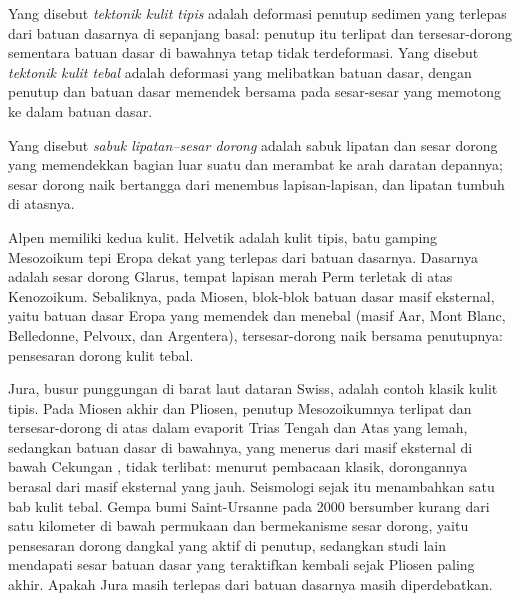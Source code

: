 \begin{definition}\label{def:b2:alpine-orogen:skin}
Yang disebut \emph{tektonik kulit tipis} adalah deformasi penutup
sedimen yang terlepas dari batuan dasarnya di sepanjang  basal: penutup itu terlipat dan
tersesar-dorong sementara batuan dasar di bawahnya tetap tidak terdeformasi. Yang disebut \emph{tektonik kulit
tebal} adalah deformasi yang melibatkan batuan dasar,
dengan penutup dan batuan dasar memendek bersama pada sesar-sesar yang memotong ke dalam batuan dasar.
\end{definition}

\begin{definition}\label{def:b2:alpine-orogen:ftb}
Yang disebut \emph{sabuk lipatan--sesar dorong} adalah sabuk lipatan dan sesar dorong
yang memendekkan bagian luar suatu  dan merambat ke arah daratan depannya; sesar dorong
naik bertangga dari  menembus lapisan-lapisan, dan lipatan tumbuh di atasnya.
\end{definition}

Alpen memiliki kedua kulit.  Helvetik adalah  kulit tipis,
batu gamping Mesozoikum tepi Eropa dekat yang terlepas dari batuan dasarnya. Dasarnya adalah
sesar dorong Glarus, tempat lapisan merah Perm terletak di atas  Kenozoikum. Sebaliknya, pada Miosen,
blok-blok batuan dasar masif eksternal, yaitu batuan dasar Eropa yang memendek dan menebal (masif
Aar, Mont Blanc, Belledonne, Pelvoux, dan Argentera), tersesar-dorong naik bersama
penutupnya: pensesaran dorong kulit tebal.

Jura, busur punggungan di barat laut dataran Swiss, adalah contoh klasik kulit
tipis. Pada Miosen akhir dan Pliosen, penutup Mesozoikumnya terlipat dan tersesar-dorong di atas
 dalam evaporit Trias Tengah dan Atas yang lemah, sedangkan batuan dasar di bawahnya,
yang menerus dari masif eksternal di bawah Cekungan , tidak terlibat: menurut
pembacaan klasik, dorongannya berasal dari masif eksternal yang jauh. Seismologi sejak itu
menambahkan satu bab kulit tebal. Gempa bumi Saint-Ursanne pada 2000 bersumber
kurang dari satu kilometer di bawah permukaan dan bermekanisme sesar dorong, yaitu pensesaran dorong dangkal yang aktif di penutup,
sedangkan studi lain mendapati sesar batuan dasar yang teraktifkan kembali sejak Pliosen paling akhir. Apakah
Jura masih terlepas dari batuan dasarnya masih diperdebatkan.

